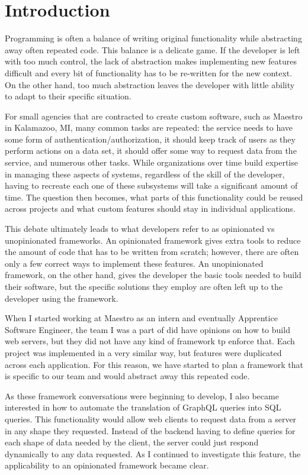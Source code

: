 \section{Introduction}

Programming is often a balance of writing original functionality while abstracting away often repeated code.  This balance is a delicate game.  If the developer is left with too much control, the lack of abstraction makes implementing new features difficult and every bit of functionality has to be re-written for the new context.  On the other hand, too much abstraction leaves the developer with little ability to adapt to their specific situation.

For small agencies that are contracted to create custom software, such as Maestro in Kalamazoo, MI, many common tasks are repeated:  the service needs to have some form of authentication/authorization, it should keep track of users as they perform actions on a data set, it should offer some way to request data from the service, and numerous other tasks.  While organizations over time build expertise in managing these aspects of systems, regardless of the skill of the developer, having to recreate each one of these subsystems will take a significant amount of time.  The question then becomes, what parts of this functionality could be reused across projects and what custom features should stay in individual applications.

This debate ultimately leads to what developers refer to as opinionated vs unopinionated frameworks.  An opinionated framework gives extra tools to reduce the amount of code that has to be written from scratch; however, there are often only a few correct ways to implement these features.  An unopinionated framework, on the other hand, gives the developer the basic tools needed to build their software, but the specific solutions they employ are often left up to the developer using the framework.

When I started working at Maestro as an intern and eventually Apprentice Software Engineer, the team I was a part of did have opinions on how to build web servers, but they did not have any kind of framework tp enforce that.  Each project was implemented in a very similar way, but features were duplicated across each application.  For this reason, we have started to plan a framework that is specific to our team and would abstract away this repeated code.

As these framework conversations were beginning to develop, I also became interested in how to automate the translation of GraphQL queries into SQL queries.  This functionality would allow web clients to request data from a server in any shape they requested.  Instead of the backend having to define queries for each shape of data needed by the client, the server could just respond dynamically to any data requested.  As I continued to investigate this feature, the applicability to an opinionated framework became clear.

